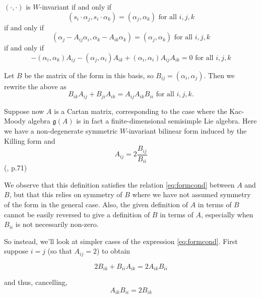 \documentclass[11pt,a4paper]{report}
\theoremstyle{definition}
\begin{document}
$(\cdot, \cdot)$ is $W$-invariant if and only if \begin{equation*}(s_i \cdot \alpha_j, s_i \cdot \alpha_k) = (\alpha_j, \alpha_k) \text{ for all } i, j, k\end{equation*} if and only if \begin{equation*}(\alpha_j - A_{ij} \alpha_i, \alpha_k - A_{ik} \alpha_k) = (\alpha_j, \alpha_k) \text{ for all } i, j, k\end{equation*} if and only if \begin{equation*}-(\alpha_i, \alpha_k) A_{ij} - (\alpha_j, \alpha_i) A_{ik} + (\alpha_i, \alpha_i) A_{ij} A_{ik} = 0 \text{ for all } i,j,k\end{equation*}

Let $B$ be the matrix of the form in this basis, so $B_{ij} = (\alpha_i, \alpha_j)$. Then we rewrite the above as \begin{equation}\label{eq:formcond}B_{ik} A_{ij} + B_{ji} A_{ik} = A_{ij} A_{ik} B_{ii} \text{ for all } i,j,k.\end{equation}

Suppose now $A$ is a Cartan matrix, corresponding to the case where the Kac-Moody algebra $\mathfrak{g}(A)$ is in fact a finite-dimensional semisimple Lie algebra. Here we have a non-degenerate symmetric $W$-invariant bilinear form induced by the Killing form and \begin{equation} \label{eq:finiteform} A_{ij} = 2 \frac{B_{ij}}{B_{ii}}\end{equation} (\cite{Carter}, p.71)

We observe that this definition satisfies the relation \eqref{eq:formcond} between $A$ and $B$, but that this relies on symmetry of $B$ where we have not assumed symmetry of the form in the general case. Also, the given definition of $A$ in terms of $B$ cannot be easily reversed to give a definition of $B$ in terms of $A$, especially when $B_{ii}$ is not necessarily non-zero.

So instead, we'll look at simpler cases of the expression \eqref{eq:formcond}. First suppose $i = j$ (so that $A_{ij} = 2$) to obtain

\begin{equation*}2 B_{ik} + B_{ii} A_{ik} = 2 A_{ik} B_{ii}\end{equation*}

and thus, cancelling, \begin{equation} \label{eq:simpleformcond1} A_{ik} B_{ii} = 2 B_{ik}\end{equation} 
\end{document}
